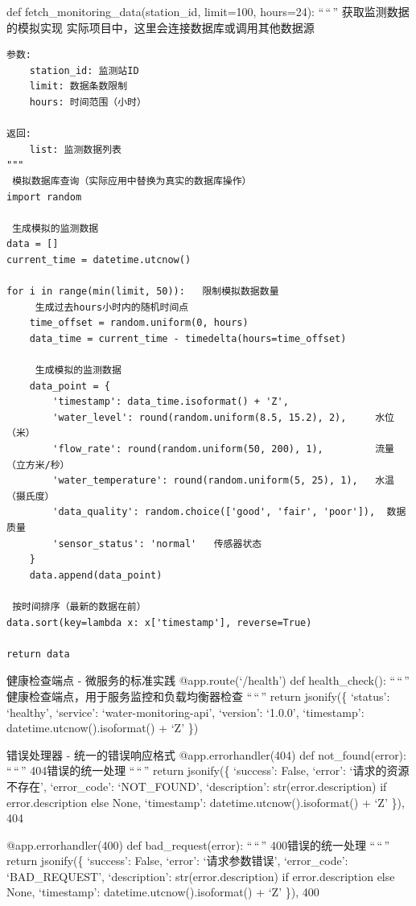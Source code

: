 def fetch\_monitoring\_data(station\_id, limit=100, hours=24): ``\,``\,'' 获取监测数据的模拟实现 实际项目中，这里会连接数据库或调用其他数据源

\begin{verbatim}
参数:
    station_id: 监测站ID
    limit: 数据条数限制
    hours: 时间范围（小时）
    
返回:
    list: 监测数据列表
"""
 模拟数据库查询（实际应用中替换为真实的数据库操作）
import random

 生成模拟的监测数据
data = []
current_time = datetime.utcnow()

for i in range(min(limit, 50)):   限制模拟数据数量
     生成过去hours小时内的随机时间点
    time_offset = random.uniform(0, hours)
    data_time = current_time - timedelta(hours=time_offset)
    
     生成模拟的监测数据
    data_point = {
        'timestamp': data_time.isoformat() + 'Z',
        'water_level': round(random.uniform(8.5, 15.2), 2),     水位（米）
        'flow_rate': round(random.uniform(50, 200), 1),         流量（立方米/秒）
        'water_temperature': round(random.uniform(5, 25), 1),   水温（摄氏度）
        'data_quality': random.choice(['good', 'fair', 'poor']),  数据质量
        'sensor_status': 'normal'   传感器状态
    }
    data.append(data_point)

 按时间排序（最新的数据在前）
data.sort(key=lambda x: x['timestamp'], reverse=True)

return data
\end{verbatim}

 健康检查端点 - 微服务的标准实践 @app.route(`/health') def health\_check(): ``\,``\,'' 健康检查端点，用于服务监控和负载均衡器检查 ``\,``\,'' return jsonify(\{ `status': `healthy', `service': `water-monitoring-api', `version': `1.0.0', `timestamp': datetime.utcnow().isoformat() + `Z' \})

 错误处理器 - 统一的错误响应格式 @app.errorhandler(404) def not\_found(error): ``\,``\,'' 404错误的统一处理 ``\,``\,'' return jsonify(\{ `success': False, `error': `请求的资源不存在', `error\_code': `NOT\_FOUND', `description': str(error.description) if error.description else None, `timestamp': datetime.utcnow().isoformat() + `Z' \}), 404

@app.errorhandler(400) def bad\_request(error): ``\,``\,'' 400错误的统一处理 ``\,``\,'' return jsonify(\{ `success': False, `error': `请求参数错误', `error\_code': `BAD\_REQUEST', `description': str(error.description) if error.description else None, `timestamp': datetime.utcnow().isoformat() + `Z' \}), 400

